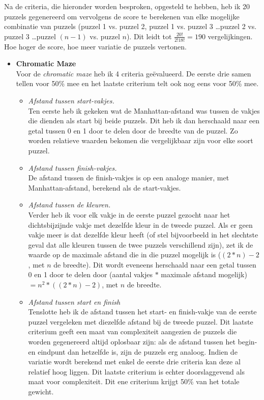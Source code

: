 \documentclass{article}
\begin{document}
Na de criteria, die hieronder worden besproken, opgesteld te hebben, heb ik 20 puzzels gegenereerd om vervolgens de score te berekenen van elke mogelijke combinatie van puzzels (puzzel 1 vs. puzzel 2, puzzel 1 vs. puzzel 3 \dots puzzel 2 vs. puzzel 3 \dots puzzel $(n-1)$ vs. puzzel $n$). Dit leidt tot $\frac{20!}{2!18!} = 190$ vergelijkingen. Hoe hoger de score, hoe meer variatie de puzzels vertonen.
\begin{itemize}
\item \textbf{Chromatic Maze}\\
Voor de \textit{chromatic maze} heb ik 4 criteria ge\"evalueerd. De eerste drie samen tellen voor 50\% mee en het laatste criterium telt ook nog eens voor 50\% mee.
\begin{itemize}

\item \textit{Afstand tussen start-vakjes.}\\
Ten eerste heb ik gekeken wat de Manhattan-afstand was tussen de vakjes die dienden als start bij beide puzzels. Dit heb ik dan herschaald naar een getal tussen 0 en 1 door te delen door de breedte van de puzzel. Zo worden relatieve waarden bekomen die vergelijkbaar zijn voor elke soort puzzel.
\item \textit{Afstand tussen finish-vakjes.}\\
De afstand tussen de finish-vakjes is op een analoge manier, met Manhattan-afstand, berekend als de start-vakjes.
\item \textit{Afstand tussen de kleuren.}\\
Verder heb ik voor elk vakje in de eerste puzzel gezocht naar het dichtsbijzijnde vakje met dezelfde kleur in de tweede puzzel. Als er geen vakje meer is dat dezelfde kleur heeft (of stel bijvoorbeeld in het slechtste geval dat alle kleuren tussen de twee puzzels verschillend zijn), zet ik de waarde op de maximale afstand die in die puzzel mogelijk is ($(2*n)-2$, met $n$ de breedte). Dit wordt eveneens herschaald naar een getal tussen 0 en 1 door te delen door (aantal vakjes $*$ maximale afstand mogelijk) $= n^2 * ((2*n)-2)$, met $n$ de breedte.
\item \textit{Afstand tussen start en finish}\\
Tenslotte heb ik de afstand tussen het start- en finish-vakje van de eerste puzzel vergeleken met diezelfde afstand bij de tweede puzzel. Dit laatste criterium geeft een maat van complexiteit aangezien de puzzels die worden gegenereerd altijd oplosbaar zijn: als de afstand tussen het begin- en eindpunt dan hetzelfde is, zijn de puzzels erg analoog. Indien de variatie wordt berekend met enkel de eerste drie criteria kan deze al relatief hoog liggen. Dit laatste criterium is echter doorslaggevend als maat voor complexiteit. Dit ene criterium krijgt 50\% van het totale gewicht.

\end{itemize}
\end{itemize}
\end{document}
